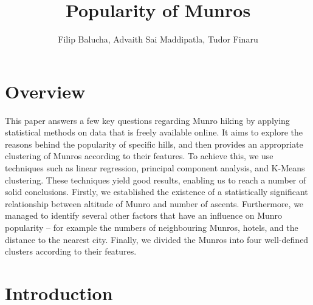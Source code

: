 \documentclass[11pt,a4paper]{article}
\title{Popularity of Munros}
\author{Filip Balucha, Advaith Sai Maddipatla, Tudor Finaru}
\begin{document}
\maketitle



\section{Overview}
This paper answers a few key questions regarding Munro hiking by applying statistical methods on data that is freely available online. It aims to explore the reasons behind the popularity of specific hills, and then provides an appropriate clustering of Munros according to their features. To achieve this, we use techniques such as linear regression, principal component analysis, and K-Means clustering. These techniques yield good results, enabling us to reach a number of solid conclusions. Firstly, we established the existence of a statistically significant relationship between altitude of Munro and number of ascents. Furthermore, we managed to identify several other factors that have an influence on Munro popularity – for example the numbers of neighbouring Munros, hotels, and the distance to the nearest city. Finally, we divided the Munros into four well-defined clusters according to their features.

\section{Introduction}
\end{document}
